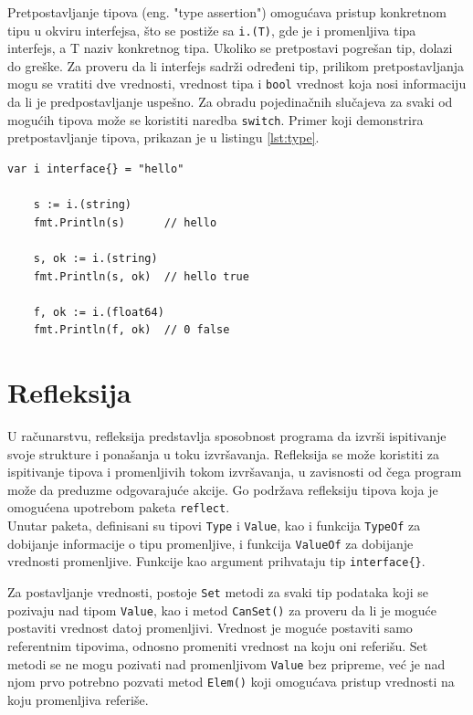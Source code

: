\documentclass[12pt,oneside]{memoir}
\begin{document}
Pretpostavljanje tipova (eng. "type assertion") omogućava pristup konkretnom tipu u okviru interfejsa, što se postiže sa \texttt{i.(T)}, gde je i promenljiva tipa interfejs, a T naziv konkretnog tipa. Ukoliko se pretpostavi pogrešan tip, dolazi do greške.  Za proveru da li interfejs sadrži određeni tip, prilikom pretpostavljanja mogu se vratiti dve vrednosti, vrednost tipa i \texttt{bool} vrednost koja nosi informaciju da li je predpostavljanje uspešno. Za obradu pojedinačnih slučajeva za svaki od mogućih tipova može se koristiti naredba \texttt{switch}.  Primer koji demonstrira pretpostavljanje tipova, prikazan je u listingu \ref{lst:type}.

\begin{center}
\begin{lstlisting}[caption=Primer koji demonstrira pretpostavljanje tipova kod interfejsa, label={lst:type},  backgroundcolor=\color{background}]
	var i interface{} = "hello"

	s := i.(string)
	fmt.Println(s) 		// hello

	s, ok := i.(string)
	fmt.Println(s, ok) 	// hello true

	f, ok := i.(float64)
	fmt.Println(f, ok) 	// 0 false
\end{lstlisting}
\end{center}


\section{Refleksija}

U računarstvu, refleksija predstavlja sposobnost programa da izvrši ispitivanje svoje strukture i ponašanja u toku izvršavanja. Refleksija se može koristiti za ispitivanje tipova i promenljivih tokom izvršavanja, u zavisnosti od čega program može da preduzme odgovarajuće akcije. Go podržava refleksiju tipova koja je omogućena upotrebom paketa \texttt{reflect}.
\\

Unutar paketa, definisani su tipovi \texttt{Type} i \texttt{Value}, kao i funkcija \texttt{TypeOf} za dobijanje informacije o tipu promenljive, i funkcija \texttt{ValueOf} za dobijanje vrednosti promenljive. Funkcije kao argument prihvataju tip \texttt{interface\{\}}. 

Za postavljanje vrednosti, postoje \texttt{Set} metodi za svaki tip podataka koji se pozivaju nad tipom \texttt{Value}, kao i metod \texttt{CanSet()} za proveru da li je moguće postaviti vrednost datoj promenljivi. Vrednost je moguće postaviti samo referentnim tipovima, odnosno promeniti vrednost na koju oni referišu. Set metodi se ne mogu pozivati nad promenljivom \texttt{Value} bez pripreme, već je nad njom prvo potrebno pozvati metod \texttt{Elem()} koji omogućava pristup vrednosti na koju promenljiva referiše.  
\end{document}
